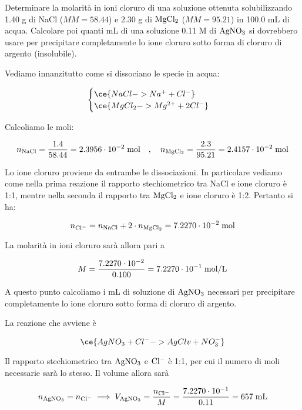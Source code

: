 \begin{esercizio}
    Determinare la molarità in ioni cloruro di una soluzione ottenuta solubilizzando 1.40 g di NaCl ($MM=58.44$) e 2.30 g di $\rm MgCl_2$ ($MM=95.21$) in 100.0 mL di acqua. Calcolare poi quanti mL di una soluzione 0.11 M di $\rm AgNO_3$ si dovrebbero usare per precipitare completamente lo ione cloruro sotto forma di cloruro di argento (insolubile).
\end{esercizio}
\begin{soluzione}
    Vediamo innanzitutto come si dissociano le specie in acqua:

$$\begin{cases}
    \ce{NaCl -> Na^+ + Cl^-}\\
    \ce{MgCl_2 -> Mg^{2+} + 2Cl^-}
\end{cases}$$

Calcoliamo le moli:

$$n_{\rm NaCl}=\frac{1.4}{58.44}=2.3956 \cdot 10^{-2} \; \text{mol}
\quad,\quad
n_{\rm MgCl_2}=\frac{2.3}{95.21}=2.4157 \cdot 10^{-2} \; \text{mol}$$

Lo ione cloruro proviene da entrambe le dissociazioni. In particolare vediamo come nella prima reazione il rapporto stechiometrico tra NaCl e ione cloruro è 1:1, mentre nella seconda il rapporto tra $\rm MgCl_2$ e ione cloruro è 1:2. Pertanto si ha:

$$n_{\rm Cl^-}
=n_{\rm NaCl} + 2 \cdot n_{\rm MgCl_2}
=7.2270 \cdot 10^{-2} \; \rm mol$$

La molarità in ioni cloruro sarà allora pari a

$$M=\frac{7.2270 \cdot 10^{-2}}{0.100}
=7.2270 \cdot 10^{-1} \; \rm mol/L$$

A questo punto calcoliamo i mL di soluzione di $\rm AgNO_3$ necessari per precipitare completamente lo ione cloruro sotto forma di cloruro di argento.

La reazione che avviene è

$$\ce{AgNO_3 + Cl^- -> Ag Cl v + NO_3^-}$$

Il rapporto stechiometrico tra $\rm AgNO_3$ e $\rm Cl^-$ è 1:1, per cui il numero di moli necessarie sarà lo stesso. Il volume allora sarà

$$n_{\rm AgNO_3}=n_{\rm Cl^-}
\implies
V_{\rm AgNO_3}=\frac{n_{\rm Cl^-}}{M}=\frac{7.2270 \cdot 10^{-1}}{0.11}=657 \; \rm mL$$
\end{soluzione}

\newpage

